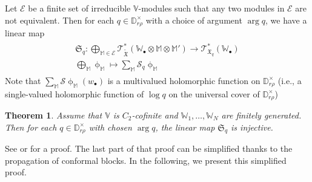 \documentclass[12pt,a4paper,notitlepage]{article}
\theoremstyle{definition}
\theoremstyle{plain}
\newtheorem{thm}[df]{Theorem}
\newcommand{\fk}{\mathfrak}
\newcommand{\mc}{\mathcal}
\newcommand{\wtd}{\widetilde}
\newcommand{\scr}{\mathscr}
\newcommand{\blt}{\bullet}
\newcommand{\Vbb}{\mathbb V}
\newcommand{\Wbb}{\mathbb W}
\newcommand{\Mbb}{\mathbb M}
\newcommand{\Dbb}{\mathbb D}
\numberwithin{equation}{section}
\begin{document}
Let $\mc E$ be a finite set of irreducible $\Vbb$-modules such that any two modules in $\mc E$ are not equivalent. Then for each $q\in\Dbb_{r\rho}^\times$ with a choice of argument $\arg q$, we have a linear map
\begin{gather}\label{eq254}
\begin{gathered}
\fk S_q:\bigoplus_{\Mbb\in\mc E}\scr T_{\wtd{\fk X}}^*(\Wbb_\blt\otimes\Mbb\otimes\Mbb')\rightarrow\scr T_{\fk X_q}^*(\Wbb_\blt)\\
\bigoplus_\Mbb\upphi_\Mbb\mapsto \sum_\Mbb\mc S_q\upphi_\Mbb
\end{gathered}
\end{gather} 
Note that $\sum_\Mbb\mc S\upphi_\Mbb(w_\blt)$ is a multivalued holomorphic function on $\Dbb_{r\rho}^\times$ (i.e.,  a single-valued holomorphic function of $\log q$ on the universal cover of $\Dbb_{r\rho}^\times$)

\begin{thm}\label{lb172}
Assume that $\Vbb$ is $C_2$-cofinite and $\Wbb_1,\dots,\Wbb_N$ are finitely generated. Then for each $q\in\Dbb_{r\rho}^\times$ with chosen $\arg q$, the linear map $\fk S_q$ is injective.
\end{thm}

See \cite[Sec. 4.4]{Gui} or \cite[Sec. 12]{Gui20} for a proof. The last part of that proof can be simplified thanks to the propagation of conformal blocks. In the following, we present this simplified proof.
\end{document}

